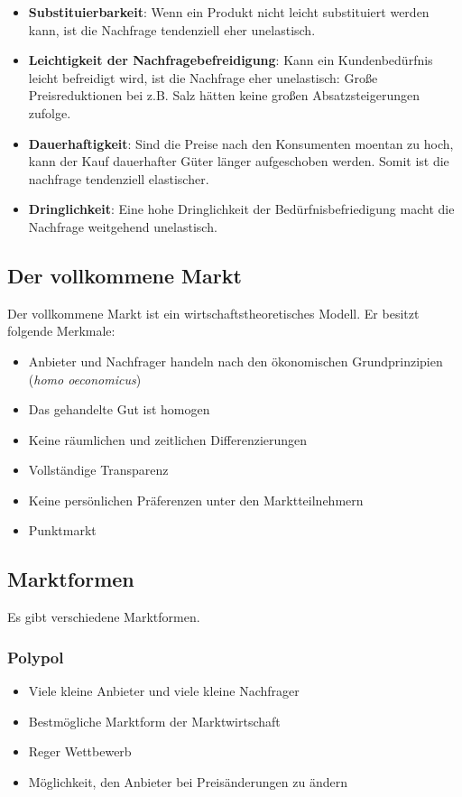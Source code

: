 \documentclass[titlepage,parskip=half]{scrartcl}
\begin{document}
\begin{itemize}
    \item \textbf{Substituierbarkeit}: Wenn ein Produkt nicht leicht substituiert werden kann, ist die Nachfrage tendenziell eher unelastisch.
    \item \textbf{Leichtigkeit der Nachfragebefreidigung}: Kann ein Kundenbedürfnis leicht befreidigt wird, ist die Nachfrage eher unelastisch: Große Preisreduktionen bei z.B. Salz hätten keine großen Absatzsteigerungen zufolge.
    \item \textbf{Dauerhaftigkeit}: Sind die Preise nach den Konsumenten moentan zu hoch, kann der Kauf dauerhafter Güter länger aufgeschoben werden. Somit ist die nachfrage tendenziell elastischer.
    \item \textbf{Dringlichkeit}: Eine hohe Dringlichkeit der Bedürfnisbefriedigung macht die Nachfrage weitgehend unelastisch.
\end{itemize}
    
\subsection{Der vollkommene Markt}
Der vollkommene Markt ist ein wirtschaftstheoretisches Modell. Er besitzt folgende Merkmale:
\begin{itemize}
    \item Anbieter und Nachfrager handeln nach den ökonomischen Grundprinzipien (\textit{homo oeconomicus})
    \item Das gehandelte Gut ist homogen
    \item Keine räumlichen und zeitlichen Differenzierungen
    \item Vollständige Transparenz
    \item Keine persönlichen Präferenzen unter den Marktteilnehmern
    \item Punktmarkt
\end{itemize}

\subsection{Marktformen}
Es gibt verschiedene Marktformen.

\subsubsection{Polypol}
\begin{itemize}
    \item Viele kleine Anbieter und viele kleine Nachfrager
    \item Bestmögliche Marktform der Marktwirtschaft
    \item Reger Wettbewerb 
    \item Möglichkeit, den Anbieter bei Preisänderungen zu ändern
\end{itemize}
\end{document}
